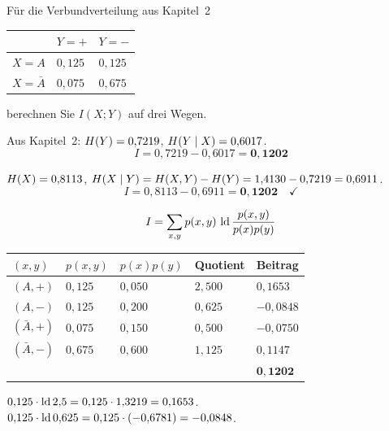 \begin{aufgabe}
Für die Verbundverteilung aus Kapitel~2
\begin{center}
{\small
\renewcommand{\arraystretch}{1.44}
\begin{tabular}{@{}P{2.0cm}P{1.8cm}P{1.8cm}@{}}
\toprule
& $Y=+$ & $Y=-$\\
\midrule
$X=A$ & $0{,}125$ & $0{,}125$\\
$X=\bar A$ & $0{,}075$ & $0{,}675$\\
\bottomrule
\end{tabular}}
\end{center}
berechnen Sie $I(X;Y)$ auf drei Wegen.

\loesung
{}
Aus Kapitel~2: $H(Y) = 0{,}7219$, $H(Y\mid X) = 0{,}6017$.
\[ I = 0{,}7219 - 0{,}6017 = \mathbf{0{,}1202} \]

$H(X) = 0{,}8113$, $H(X\mid Y) = H(X,Y)-H(Y) = 1{,}4130-0{,}7219 = 0{,}6911$.
\[ I = 0{,}8113 - 0{,}6911 = \mathbf{0{,}1202} \quad \checkmark \]

\[ I = \sum_{x,y} p(x,y)\,\operatorname{ld}\frac{p(x,y)}{p(x)p(y)} \]

\begin{center}
{\small
\renewcommand{\arraystretch}{1.48}
\begin{tabular}{@{}P{1.6cm}P{1.6cm}P{1.8cm}P{1.6cm}P{1.8cm}@{}}
\toprule
$(x,y)$ & $p(x,y)$ & $p(x)p(y)$ & \textbf{Quotient} & \textbf{Beitrag}\\
\midrule
$(A,+)$ & $0{,}125$ & $0{,}050$ & $2{,}500$ & $0{,}1653$\\
$(A,-)$ & $0{,}125$ & $0{,}200$ & $0{,}625$ & $-0{,}0848$\\
$(\bar A,+)$ & $0{,}075$ & $0{,}150$ & $0{,}500$ & $-0{,}0750$\\
$(\bar A,-)$ & $0{,}675$ & $0{,}600$ & $1{,}125$ & $0{,}1147$\\
\midrule
& & & & $\mathbf{0{,}1202}$\\
\bottomrule
\end{tabular}}
\end{center}

 $0{,}125\cdot\operatorname{ld} 2{,}5 = 0{,}125\cdot1{,}3219 = 0{,}1653$.\\
 $0{,}125\cdot\operatorname{ld}0{,}625 = 0{,}125\cdot(-0{,}6781) = -0{,}0848$.


\end{aufgabe}
